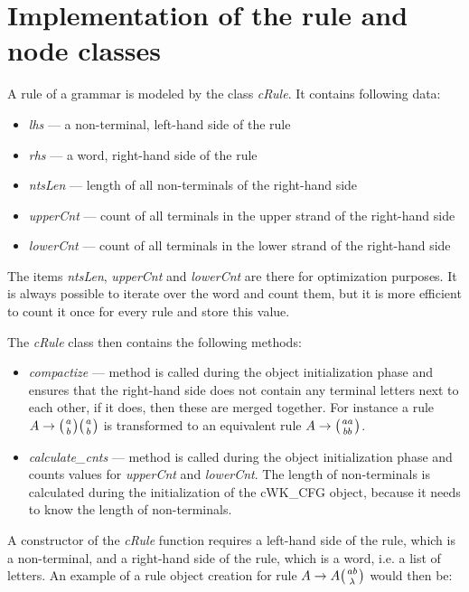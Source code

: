 \section{Implementation of the rule and node classes} \label{section:cRule_cNode}
A rule of a grammar is modeled by the class \textit{cRule}. It contains following data:
\begin{itemize}
  \item{\textit{lhs} --- a non-terminal, left-hand side of the rule}
  \item{\textit{rhs} --- a word, right-hand side of the rule}
  \item{\textit{ntsLen} --- length of all non-terminals of the right-hand side}
  \item{\textit{upperCnt} --- count of all terminals in the upper strand of the right-hand side}
  \item{\textit{lowerCnt} --- count of all terminals in the lower strand of the right-hand side}
\end{itemize}

The items \textit{ntsLen}, \textit{upperCnt} and \textit{lowerCnt} are there for optimization purposes. It is always possible to iterate over the word and count them, but it is more efficient to count it once for every rule and store this value.

The \textit{cRule} class then contains the following methods:
\begin{itemize}
  \item{\textit{compactize} --- method is called during the object initialization phase and ensures that the right-hand side does not contain any terminal letters next to each other, if it does, then these are merged together. For instance a rule $A \rightarrow \wkpair{a}{b} \wkpair{a}{b}$ is transformed to an equivalent rule $A \rightarrow \wkpair{aa}{bb}$.}
  \item{\textit{calculate\_cnts} --- method is called during the object initialization phase and counts values for \textit{upperCnt} and \textit{lowerCnt}}. The length of non-terminals is calculated during the initialization of the cWK\_CFG object, because it needs to know the length of non-terminals.
\end{itemize}

A constructor of the \textit{cRule} function requires a left-hand side of the rule, which is a non-terminal, and a right-hand side of the rule, which is a word, i.e. a list of letters. An example of a rule object creation for rule $A \rightarrow A \wkpair{ab}{\lambda}$ would then be:

